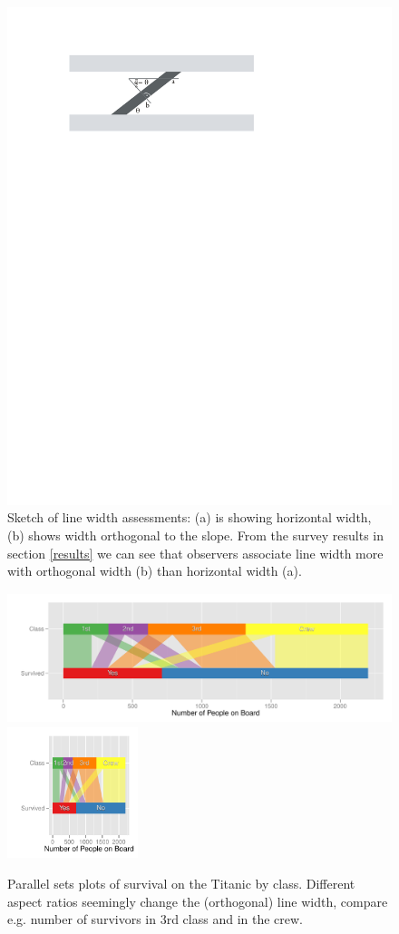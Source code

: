\begin{figure}[htbp]
\begin{center}
\includegraphics[width=0.6\linewidth]{images/linewidth}
\end{center}
\caption{\label{fig:linewidth}Sketch of line width assessments: (a) is showing  horizontal width, (b) shows  width orthogonal to the slope. From the survey results in section \ref{results} we can see that  observers associate line width more with  orthogonal width (b) than horizontal width (a).}
\end{figure}





\begin{figure}[htbp]
\begin{center}
\includegraphics[height=1.5in]{images/aspect31-titanic.pdf}
\includegraphics[height=1.5in]{images/aspect33-titanic.pdf}
\end{center}
\caption{\label{fig:aspect}Parallel sets plots of survival on the Titanic by class. Different aspect ratios  seemingly change the (orthogonal) line width, compare e.g. number of survivors in 3rd class and in the crew. }
\end{figure}




